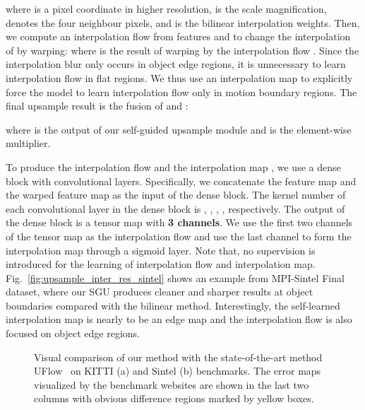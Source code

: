 \documentclass[final]{cvpr}
\begin{document}
where  is a pixel coordinate in higher resolution,  is the scale magnification,  denotes the four neighbour pixels, and  is the bilinear interpolation weights. 
Then, we compute an interpolation flow  from features  and  to change the interpolation of  by warping: 
where  is the result of warping  by the interpolation flow . Since the interpolation blur only occurs in object edge regions, it is unnecessary to learn interpolation flow in flat regions. We thus use an interpolation map  to explicitly force the model to learn interpolation flow only in motion boundary regions. The final upsample result is the fusion of  and :

where  is the output of our self-guided upsample module and  is the element-wise multiplier. 

To produce the interpolation flow  and the interpolation map , we use a dense block with  convolutional layers. Specifically, we concatenate the feature map  and the warped feature map  as the input of the dense block. The kernel number of each convolutional layer in the dense block is , , , ,  respectively. The output of the dense block is a tensor map with \textbf{3 channels}. We use the first two channels of the tensor map as the interpolation flow and use the last channel to form the interpolation map through a sigmoid layer. 
Note that, no supervision is introduced for the learning of interpolation flow and interpolation map. Fig.~\ref{fig:upsample_inter_res_sintel} shows an example from MPI-Sintel Final dataset, where our SGU produces cleaner and sharper results at object boundaries compared with the bilinear method. Interestingly, the self-learned interpolation map is nearly to be an edge map and the interpolation flow is also focused on object edge regions. \begin{figure*}[ht]
	\centering
	\caption{Visual comparison of our method with the state-of-the-art method UFlow~\cite{jonschkowski2020matters} on KITTI (a) and Sintel (b) benchmarks. The error maps visualized by the benchmark websites are shown in the last two columns with obvious difference regions marked by yellow boxes. }
\label{fig:results_pk_benchmark}
\end{figure*}
\end{document}
